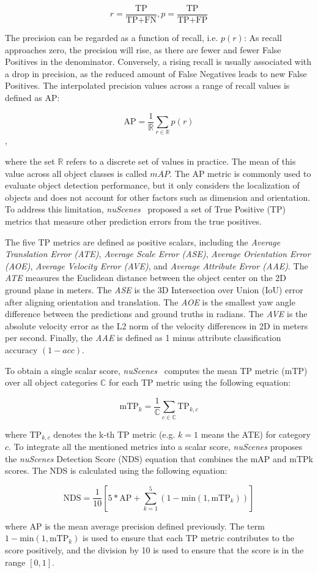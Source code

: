 \[
    r = \frac{\text{TP}}{\text{TP}+\text{FN}}, p = \frac{\text{TP}}{\text{TP}+\text{FP}}
\]

The precision can be regarded as a function of recall, i.e. $p(r)$: As recall approaches zero, the precision will rise, as there are fewer and fewer False Positives in the denominator.
Conversely, a rising recall is usually associated with a drop in precision, as the reduced amount of False Negatives leads to new False Positives.
The interpolated precision values across a range of recall values is defined as AP:

\[
    \text{AP} = \frac{1}{\mathbb{R}} \sum_{r \in \mathbb{R}} p(r)
\],

where the set $\mathbb{R}$ refers to a discrete set of values in practice.
The mean of this value across all object classes is called $mAP$.
The AP metric is commonly used to evaluate object detection performance, but it only considers the localization of objects and does not account for other factors such as dimension and orientation.
To address this limitation, \textit{nuScenes}~\cite{caesar2020nuscenes} proposed a set of True Positive (TP) metrics that measure other prediction errors from the true positives.

The five TP metrics are defined as positive scalars, including the \textit{Average Translation Error (ATE)}, \textit{Average Scale Error (ASE)}, \textit{Average Orientation Error (AOE)}, \textit{Average Velocity Error (AVE)}, and \textit{Average Attribute Error (AAE)}.
The \textit{ATE} measures the Euclidean distance between the object center on the 2D ground plane in meters.
The \textit{ASE} is the 3D Intersection over Union (IoU) error after aligning orientation and translation.
The \textit{AOE} is the smallest yaw angle difference between the predictions and ground truths in radians.
The \textit{AVE} is the absolute velocity error as the L2 norm of the velocity differences in 2D in meters per second.
Finally, the \textit{AAE} is defined as 1 minus attribute classification accuracy $(1-acc)$.

To obtain a single scalar score, \textit{nuScenes}~\cite{caesar2020nuscenes} computes the mean TP metric (mTP) over all object categories $\mathbb{C}$ for each TP metric using the following equation:

\[
    \text{mTP}_k = \frac{1}{\mathbb{C}} \sum_{c \in \mathbb{C}} \text{TP}_{k,c}
\]

where $\text{TP}_{k,c}$ denotes the k-th TP metric (e.g. $k=1$ means the ATE) for category $c$.
To integrate all the mentioned metrics into a scalar score, \textit{nuScenes} proposes the \textit{nuScenes} Detection Score (NDS) equation that combines the mAP and mTPk scores.
The NDS is calculated using the following equation:

\[
    \text{NDS} = \frac{1}{10} \left[5 * \text{AP} + \sum^5_{k=1}(1-\text{min}(1, \text{mTP}_k))\right]
\]

where AP is the mean average precision defined previously.
The term $1-\text{min}(1, \text{mTP}_k)$ is used to ensure that each TP metric contributes to the score positively, and the division by 10 is used to ensure that the score is in the range $[0, 1]$.

